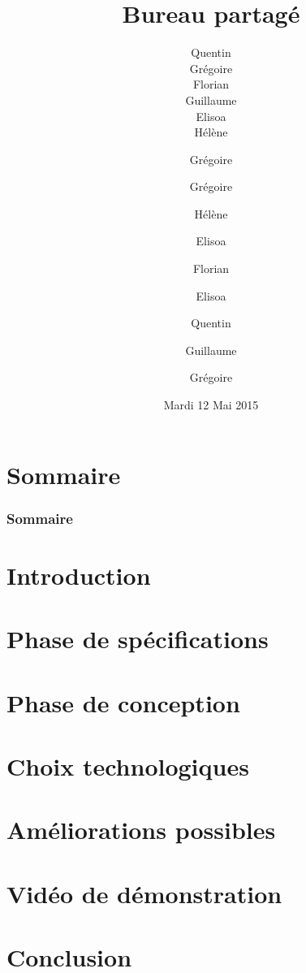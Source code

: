 \documentclass[11pt, handout]{beamer}
\title[Bureau partagé]{Bureau partagé}
\author{Quentin \bsc{Diaferia} \\ 
        Grégoire \bsc{Gutzwiller} \\ 
        Florian \bsc{Lepetit} \\ 
        Guillaume \bsc{Minette de Saint-Martin} \\ 
        Elisoa \bsc{Ramarokoto} \\ 
        Hélène \bsc{Soudry}}
\date[12/05/2015]{Mardi 12 Mai 2015}
\begin{document}
\begin{frame}[plain]
	\maketitle
\end{frame}


\section*{Sommaire}
\author{Grégoire }
\begin{frame}
	\frametitle{Sommaire}
	\tableofcontents
\end{frame}

\section{Introduction}
\author{Grégoire }


\section{Phase de spécifications}
\author{Hélène }


\section{Phase de conception}
\author{Elisoa }


\section{Choix technologiques}
\author{Florian }


\author{Elisoa }


\section{Améliorations possibles}
\author{Quentin }


\section{Vidéo de démonstration}
\author{Guillaume }


\section{Conclusion}
\author{Grégoire }

\end{document}
